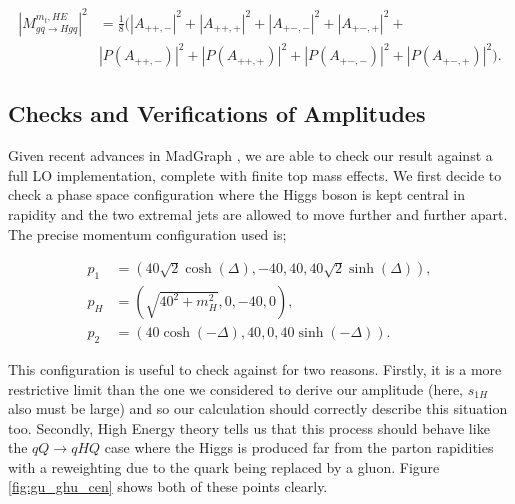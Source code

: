 \begin{equation}
\begin{split}
|M_{gq \to Hgq}^{m_t, HE}|^2 &= \frac{1}{8} \big( |A_{++,-}|^2 + |A_{++,+}|^2 + |A_{+-,-}|^2 + |A_{+-,+}|^2 + \\
&|P(A_{++,-})|^2 + |P(A_{++,+})|^2 + |P(A_{+-,-})|^2 + |P(A_{+-,+})|^2 \big).
\end{split}
\end{equation}

\subsection{Checks and Verifications of Amplitudes}

Given recent advances in MadGraph \cite{Alwall2007}, we are able to check our result against a full LO implementation, complete with finite top mass effects. We first decide to check a phase space configuration where the Higgs boson is kept central in rapidity and the two extremal jets are allowed to move further and further apart. The precise momentum configuration used is; 

\begin{subequations}
\begin{align}
p_1 &= (40 \sqrt{2} \cosh(\Delta),-40,40,40 \sqrt{2} \sinh(\Delta)), \\
p_H &= (\sqrt{40^2+m_H^2}, 0,-40,0), \\
p_2 &= (40 \cosh(-\Delta),40,0,40 \sinh(-\Delta)).
\end{align}
\end{subequations}

This configuration is useful to check against for two reasons. Firstly, it is a more restrictive limit than the one we considered to derive our amplitude (here, $s_{1H}$ also must be large) and so our calculation should correctly describe this situation too. Secondly, High Energy theory tells us that this process should behave like the $qQ \to qHQ$ case where the Higgs is produced far from the parton rapidities with a reweighting due to the quark being replaced by a gluon. Figure \ref{fig:gu_ghu_cen} shows both of these points clearly. 

